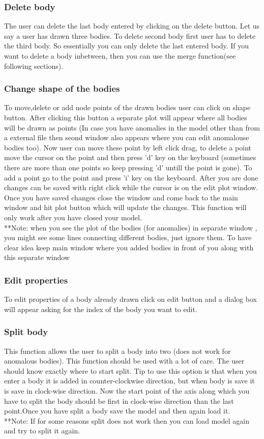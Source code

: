 \documentclass[14pt]{article}
\begin{document}
\subsubsection{Delete body}
The user can delete the last body entered by clicking on the delete button. Let us say a user has drawn three bodies. To delete second body first user has to delete the third body. So essentially you can only delete the last entered body. If you want to delete a body inbetween, then you can use the merge function(see following sections).
\subsubsection{Change shape of the bodies}
To move,delete or add node points of the drawn bodies user can click on shape button. After clicking this button a separate plot will appear where all bodies will be drawn as points (In case you have anomalies in the model other than from a external file then seond window also appears where you can edit anomalouse bodies too). Now user can move these point by left click drag, to delete a point move the cursor on the point and then press 'd' key on the keyboard (sometimes there are more than one points so keep pressing 'd' untill the point is gone). To add a point go to the point and press 'i' key on the keyboard. After you are done changes can be saved with right click while the cursor is on the edit plot window. Once you have saved changes close the window and come back to the main window and hit plot button which will update the changes. This function will only work after you have closed your model. \\
**Note: when you see the plot of the bodies (for anomalies) in separate window , you might see some lines connecting different bodies, just ignore them. To have clear idea keep main window where you added bodies in front of you along with this separate window
\subsubsection{Edit properties}
To edit properties of a body already drawn click on edit button and a dialog box will appear asking for the index of the body you want to edit. 
\subsubsection{Split body}
This function allows the user to split a body into two (does not work for anomalous bodies). This function should be used with a lot of care. The user should know exactly where to start split. Tip to use this option is that when you enter a body it is added in counter-clockwise direction, but when body is save it is save in clock-wise direction. Now the start point of the axis along which you have to split the body should be first in clock-wise direction than the last point.Once you have split a body save the model and then again load it. \\
**Note: If for some reasons split does not work then you can load model again and try to split it again.
\end{document}
